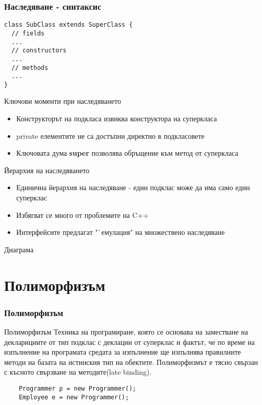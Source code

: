 \documentclass{beamer}
\begin{document}
\begin{frame}[fragile]
  \frametitle{Наследяване - синтаксис}
  \transdissolve
\begin{lstlisting}
class SubClass extends SuperClass {
  // fields
  ...
  // constructors
  ...
  // methods
  ...
}
\end{lstlisting}
\end{frame}

\begin{frame}{Ключови моменти при наследяването}
  \transdissolve
  \begin{itemize}
  \item Конструкторът на подкласа извиква конструктора на суперкласа
  \item private елементите не са достъпни директно в подкласовете
  \item Ключовата дума \textbf{super} позволява обръщение към метод от
    суперкласа
  \end{itemize}
\end{frame}

\begin{frame}{Йерархия на наследяването}
  \transdissolve
  \begin{itemize}
  \item Единична йерархия на наследяване - един подклас може да има
    само един суперклас
  \item Избягват се много от проблемите на C++
  \item Интерфейсите предлагат "`емулация" на множествено наследяване
  \end{itemize}
\end{frame}


\begin{frame}{Диаграма}
  \transdissolve
  
\end{frame}

\section{Полиморфизъм}


\begin{frame}[fragile]
  \frametitle{Полиморфизъм}
  \transdissolve
  \begin{block}{Полиморфизъм}
    Техника на програмиране, която се основава на заместване на
    декларициите от тип подклас с деклации от суперклас и фактът, че
    по време на изпълнение на програмата средата за изпълнение ще
    изпълнява правилните методи на базата на истинския тип на
    обектите. Полиморфизмът е тясно свързан с късното свързване на
    методите(late binding).
  \end{block}
  \begin{lstlisting}
    Programmer p = new Programmer();
    Employee e = new Programmer();
  \end{lstlisting}

\end{frame}
\end{document}
